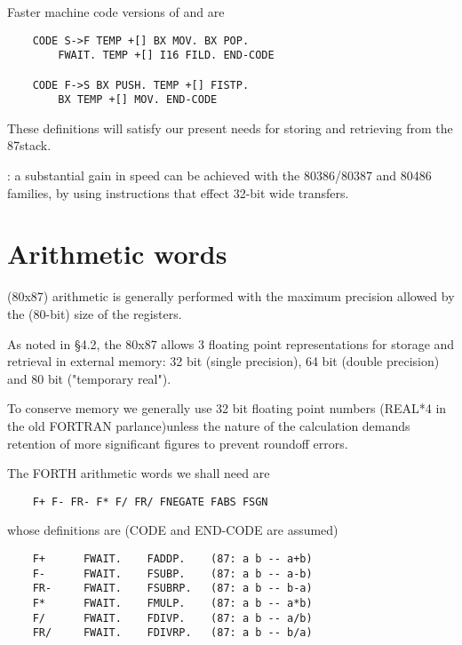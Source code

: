 Faster machine code versions of  and  are

\begin{lstlisting}
    CODE S->F TEMP +[] BX MOV. BX POP.
        FWAIT. TEMP +[] I16 FILD. END-CODE

    CODE F->S BX PUSH. TEMP +[] FISTP.
        BX TEMP +[] MOV. END-CODE
\end{lstlisting}

These definitions will satisfy our present needs for storing and retrieving from the 87stack.

\leftbar[1\linewidth]
\Note: a substantial gain in speed can be achieved with the
80386/80387 and 80486 families, by using instructions that effect
32-bit wide transfers\footnotemark.
\endleftbar
{}

\section{Arithmetic words}

 (80x87) arithmetic is generally performed with the maximum precision allowed by the (80-bit) size of the registers.

As noted in \S4.2, the 80x87 allows 3 floating point representations for storage and retrieval in external memory: 32 bit (single precision), 64 bit (double precision) and 80 bit ("temporary real").

To conserve memory we generally use 32 bit floating point numbers (REAL*4 in the old FORTRAN parlance)unless the nature of the calculation demands retention of more significant figures to prevent roundoff errors.

The FORTH arithmetic words we shall need are
\begin{lstlisting}
    F+ F- FR- F* F/ FR/ FNEGATE FABS FSGN
\end{lstlisting}
whose definitions are (CODE and END-CODE are assumed)

\begin{lstlisting}
    F+      FWAIT.    FADDP.    (87: a b -- a+b)
    F-      FWAIT.    FSUBP.    (87: a b -- a-b)
    FR-     FWAIT.    FSUBRP.   (87: a b -- b-a)
    F*      FWAIT.    FMULP.    (87: a b -- a*b)
    F/      FWAIT.    FDIVP.    (87: a b -- a/b)
    FR/     FWAIT.    FDIVRP.   (87: a b -- b/a)
\end{lstlisting}

